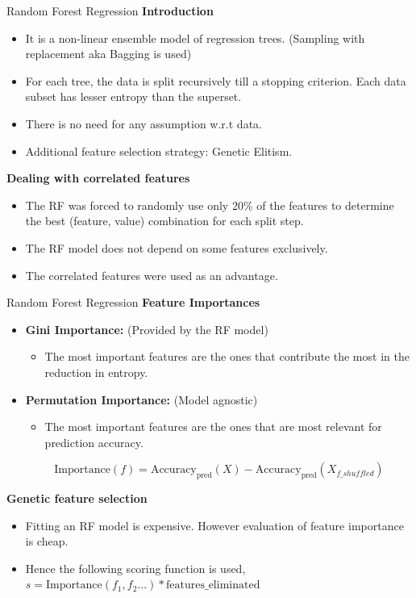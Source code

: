 \documentclass{beamer}
\begin{document}
\begin{frame}[t]{Random Forest Regression}
\textbf{Introduction}
\begin{itemize}
\item It is a non-linear ensemble model of regression trees.  (Sampling with replacement aka Bagging is used)
\item For each tree,  the data is split recursively till a stopping criterion.  Each data subset has lesser entropy than the superset.
\item There is no need for any assumption w.r.t data.
\item Additional feature selection strategy: Genetic Elitism.
\end{itemize}
\textbf{Dealing with correlated features}
\begin{itemize}
\item The RF was forced to randomly use only 20\% of the features to determine the best (feature, value) combination for each split step.
\item The RF model does not depend on some features exclusively.
\item The correlated features were used as an advantage.
\end{itemize}
\end{frame}
 
 \begin{frame}[t]{Random Forest Regression}
\textbf{Feature Importances}
\begin{itemize}
\item \textbf{Gini Importance:} (Provided by the RF model) 
\begin{itemize}
\item The most important features are the ones that contribute the most in the reduction in entropy.
\end{itemize}  
\item \textbf{Permutation Importance:} (Model agnostic)
\begin{itemize}
\item The most important features are the ones that are most relevant for prediction accuracy.
\end{itemize}
$$\mathrm{Importance}(f) = \mathrm{Accuracy_{pred}}(X) - \mathrm{Accuracy_{pred}}(X_{f\_shuffled})$$
\end{itemize}

\textbf{Genetic feature selection}
\begin{itemize}
\item Fitting an RF model is expensive.  However evaluation of feature importance is cheap.
\item Hence the following scoring function is used,  $s = \mathrm{Importance}(f_1,  f_2 ... ) * \mathrm{features\_eliminated}$
\end{itemize}

\end{frame}
\end{document}
